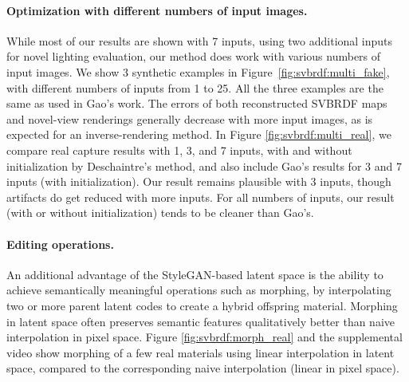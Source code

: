 

\paragraph{Optimization with different numbers of input images.} While most of our results are shown with 7 inputs, using two additional inputs for novel lighting evaluation, our method does work with various numbers of input images. We show 3 synthetic examples in Figure~\ref{fig:svbrdf:multi_fake}, with different numbers of inputs from 1 to 25. All the three examples are the same as used in Gao's work. The errors of both reconstructed SVBRDF maps and novel-view renderings generally decrease with more input images, as is expected for an inverse-rendering method. In Figure \ref{fig:svbrdf:multi_real}, we compare real capture results with 1, 3, and 7 inputs, with and without initialization by Deschaintre's method, and also include Gao's results for 3 and 7 inputs (with initialization). Our result remains plausible with 3 inputs, though artifacts do get reduced with more inputs. For all numbers of inputs, our result (with or without initialization) tends to be cleaner than Gao's.



\paragraph{Editing operations.} An additional advantage of the StyleGAN-based latent space is the ability to achieve semantically meaningful operations such as morphing, by interpolating two or more parent latent codes to create a hybrid offspring material. Morphing in latent space often preserves semantic features qualitatively better than naive interpolation in pixel space. Figure \ref{fig:svbrdf:morph_real} and the supplemental video show morphing of a few real materials using linear interpolation in latent space, compared to the corresponding naive interpolation (linear in pixel space).


